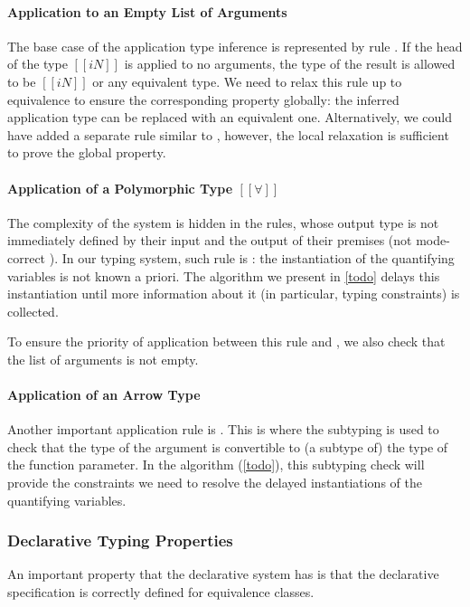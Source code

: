 \paragraph{Application to an Empty List of Arguments}
  The base case of the application type inference is 
  represented by rule .
  If the head of the type $[[iN]]$ is applied to no arguments, 
  the type of the result is allowed to be $[[iN]]$ or any 
  equivalent type. We need to relax this rule up to equivalence
  to ensure the corresponding property globally:
  the inferred application type can be replaced with an equivalent one.
  Alternatively, we could have added a separate rule similar to 
  , however, 
  the local relaxation is sufficient to prove the global property.

\paragraph{Application of a Polymorphic Type $[[∀]]$}
  The complexity of the system is hidden in the rules, 
  whose output type is not immediately defined by their input
  and the output of their premises 
  (\aka not mode-correct \cite{dunfield2020:bidirectional}).
  In our typing system, such rule is : 
  the instantiation of the quantifying variables is
  not known a priori. The algorithm we present in \cref{todo} 
  delays this instantiation until more information about it 
  (in particular, typing constraints) is collected.

  To ensure the priority of application between this rule and 
  , we also check that 
  the list of arguments is not empty.

\paragraph{Application of an Arrow Type}
  Another important application rule is .
  This is where the subtyping is used to check that the type of the argument
  is convertible to (a subtype of) the type of the function parameter.
  In the algorithm (\cref{todo}), this subtyping check will provide the constraints
  we need to resolve the delayed instantiations of the quantifying variables.

\subsubsection{Declarative Typing Properties}
  An important property that the declarative system has is
  that the declarative specification is correctly defined for
  equivalence classes.

